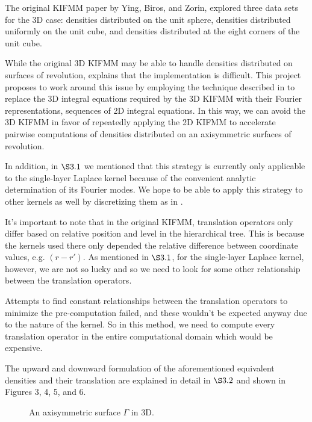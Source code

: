 \documentclass[11pt, oneside]{article}   	%
\begin{document}
The original KIFMM paper by Ying, Biros, and Zorin, explored three data sets for the 3D case: densities distributed on the unit sphere, densities distributed uniformly on the unit cube, and densities distributed at the eight corners of the unit cube.

While the original 3D KIFMM may be able to handle densities distributed on surfaces of revolution, \cite{YBZ} explains that the implementation is difficult. This project proposes to work around this issue by employing the technique described in \cite{YYM} to replace the 3D integral equations required by the 3D KIFMM with their Fourier representations, sequences of 2D integral equations. In this way, we can avoid the 3D KIFMM in favor of repeatedly applying the 2D KIFMM to accelerate pairwise computations of densities distributed on an axisymmetric surfaces of revolution.

In addition, in $\S3.1$ we mentioned that this strategy is currently only applicable to the single-layer Laplace kernel because of the convenient analytic determination of its Fourier modes. We hope to be able to apply this strategy to other kernels as well by discretizing them as in \cite{YYM}.

It's important to note that in the original KIFMM, translation operators only differ based on relative position and level in the hierarchical tree. This is because the kernels used there only depended the relative difference between coordinate values, e.g. $(r-r')$. As mentioned in $\S3.1$, for the single-layer Laplace kernel, however, we are not so lucky and so we need to look for some other relationship between the translation operators.

Attempts to find constant relationships between the translation operators to minimize the pre-computation failed, and these wouldn't be expected anyway due to the nature of the kernel. So in this method, we need to compute every translation operator in the entire computational domain which would be expensive.


The upward and downward formulation of the aforementioned equivalent densities and their translation are explained in detail in $\S3.2$ and shown in Figures 3, 4, 5, and 6.

\begin{figure}[!ht]
\begin{center}
\end{center}
\caption{An axisymmetric surface $\Gamma$ in 3D.}
\end{figure}
\end{document}
